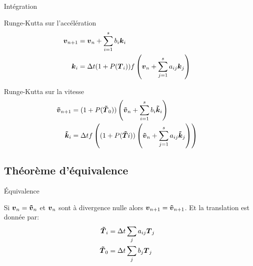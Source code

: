 \begin{frame}[<+->]{Intégration}
 \begin{block}{Runge-Kutta sur l'accélération}
   \begin{align*}
	{\boldsymbol {v}}_{n+1}&={\boldsymbol {v}}_{n}+\sum_{i=1}^{s}b_{i}{\boldsymbol {k}}_{i}\\
	{\boldsymbol {k}}_{i}&=\Delta t (1+P({\boldsymbol {T}}_{i}))f\left({\boldsymbol {v}}_{n}+\sum_{j=1}^{s}a_{ij}{\boldsymbol {k}}_{j}\right)
\end{align*}
 \end{block}
 
  \begin{block}{Runge-Kutta sur la vitesse}
   \begin{align*}
{\boldsymbol {\tilde{v}}}_{n+1}&=(1+P({\boldsymbol {\tilde{T}}}_0))\left({\boldsymbol {\tilde{v}}}_{n}+\sum_{i=1}^{s}b_{i}{\boldsymbol {\tilde{k}}}_{i}\right)\\
{\boldsymbol {\tilde{k}}}_{i}&=\Delta t f\left((1+P({\boldsymbol {\tilde{T}}}{i}))\left({\boldsymbol {\tilde{v}}}_{n}+\sum_{j=1}^{s}a_{ij}{\boldsymbol {\tilde{k}}}_{j}\right)\right)
\end{align*}
 \end{block}
\end{frame}
\subsection{Théorème d'équivalence}
\begin{frame}{Équivalence}
 \begin{theorem}
Si ${\boldsymbol {v}}_{n}={\boldsymbol {\tilde{v}}}_{n}$ et ${\boldsymbol {v}}_n$ sont à divergence nulle alors ${\boldsymbol {v}}_{n+1}={\boldsymbol {\tilde{v}}}_{n+1}$.
Et la translation est donnée par:
\begin{align*}
  {\boldsymbol {\tilde{T}}}_{i}&=\Delta t\sum_{j}a_{ij}{\boldsymbol {T}}_{j}\\
  {\boldsymbol {\tilde{T}}}_{0}&=\Delta t\sum_{j}b_{j}{\boldsymbol {T}}_{j}
\end{align*}
 \end{theorem}
\end{frame}

